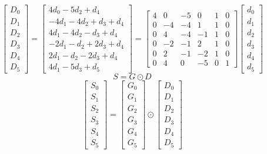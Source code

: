 \documentclass{article}%
\begin{document}
\[%
\left[\begin{matrix}D_{0}\\D_{1}\\D_{2}\\D_{3}\\D_{4}\\D_{5}\end{matrix}\right] = \left[\begin{matrix}4 d_{0} - 5 d_{2} + d_{4}\\- 4 d_{1} - 4 d_{2} + d_{3} + d_{4}\\4 d_{1} - 4 d_{2} - d_{3} + d_{4}\\- 2 d_{1} - d_{2} + 2 d_{3} + d_{4}\\2 d_{1} - d_{2} - 2 d_{3} + d_{4}\\4 d_{1} - 5 d_{3} + d_{5}\end{matrix}\right] = \left[\begin{matrix}4 & 0 & -5 & 0 & 1 & 0\\0 & -4 & -4 & 1 & 1 & 0\\0 & 4 & -4 & -1 & 1 & 0\\0 & -2 & -1 & 2 & 1 & 0\\0 & 2 & -1 & -2 & 1 & 0\\0 & 4 & 0 & -5 & 0 & 1\end{matrix}\right] \left[\begin{matrix}d_{0}\\d_{1}\\d_{2}\\d_{3}\\d_{4}\\d_{5}\end{matrix}\right]%
\]%
\[%
S = G \odot D%
\]%
\[%
\left[\begin{matrix}S_{0}\\S_{1}\\S_{2}\\S_{3}\\S_{4}\\S_{5}\end{matrix}\right] = \left[\begin{matrix}G_{0}\\G_{1}\\G_{2}\\G_{3}\\G_{4}\\G_{5}\end{matrix}\right] \odot \left[\begin{matrix}D_{0}\\D_{1}\\D_{2}\\D_{3}\\D_{4}\\D_{5}\end{matrix}\right]%
\]%
\end{document}
